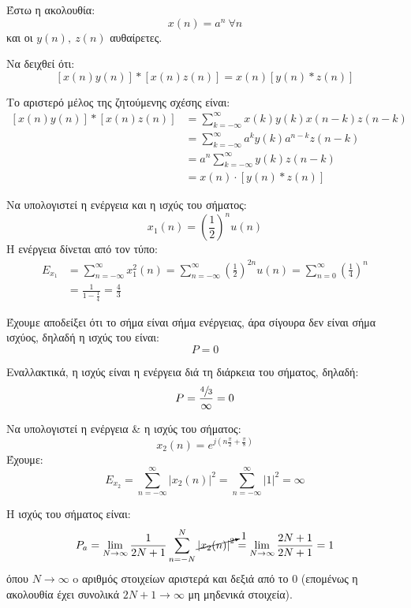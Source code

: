\documentclass[11pt,a4paper,notitlepage,fleqn]{article}
\begin{document}
\begin{exercise}
	Έστω η ακολουθία:
	\[
	x(n) = a^n\ \forall n
	\]
	και οι \( y(n), \ z(n) \) αυθαίρετες.
	
	Να δειχθεί ότι:
	\[
	\left[
	x(n)y(n)
	\right]*\left[
	x(n)z(n)
	\right] = x(n)\left[
	y(n)*z(n)
	\right]
	\]
	
	\tcblower
	
	Το αριστερό μέλος της ζητούμενης σχέσης είναι:
	\begin{align*}
		\left[
		x(n)y(n)
		\right]*\left[
		x(n)z(n)
		\right] &=
		\sum_{k=-\infty}^{\infty}
		x(k)y(k)x(n-k)z(n-k)
		\\ &= \sum_{k=-\infty}^{\infty} a^k y(k)a^{n-k} z(n-k)
		\\ &= a^n \sum_{k=-\infty}^{\infty} y(k) z(n-k)
		\\ &= x(n) \cdot \left[y(n) * z(n)\right]
	\end{align*}
\end{exercise}

\begin{exercise}
	Να υπολογιστεί η ενέργεια και η ισχύς του σήματος:
	\[
	x_1(n) = \left( \frac{1}{2} \right)^n u(n)
	\]
	\tcblower
	Η ενέργεια δίνεται από τον τύπο:
	\begin{align*}
		E_{x_1} &=
		\sum_{n=-\infty}^{\infty}x_1^2(n) = \sum_{n=-\infty}^{\infty}\left(\frac{1}{2}\right)^{2n}
		u(n) = \sum_{n=0}^{\infty}\left( \frac{1}{4} \right)^n
		\\ &= \frac{1}{1-\frac{1}{4}} = \frac{4}{3}
	\end{align*}
	
	Έχουμε αποδείξει ότι το σήμα είναι σήμα ενέργειας, άρα σίγουρα δεν είναι σήμα ισχύος, δηλαδή η ισχύς του είναι:
	\[
	P=0
	\]
	
	Εναλλακτικά, η ισχύς είναι η ενέργεια διά τη διάρκεια του σήματος, δηλαδή:
	\[
	P = \frac{\sfrac{4}{3} }{\infty} = 0
	\]
\end{exercise}

\begin{exercise}
	Να υπολογιστεί η ενέργεια \& η ισχύς του σήματος:
	\[
	x_2(n) = e^{j\left( n\frac{π}{2} + \frac{π}{8} \right)}
	\]
	\tcblower
	Έχουμε:
	\[
	E_{x_2} = \sum_{n=-\infty}^{\infty} \left|x_2(n)\right|^2 = \sum_{n=-\infty}^{\infty} |1|^2 = \infty
	\]
	
	Η ισχύς του σήματος είναι:
	\[
	P_a = \lim_{N\to \infty}\frac{1}{2N+1}
	\sum_{n=-N}^{N} \cancelto{1}{\left|x_2(n)\right|^2}
	= \lim_{N\to \infty}\frac{2N+1}{2N+1} = 1
	\]
	όπου \( N\to \infty \) o αριθμός στοιχείων αριστερά και δεξιά από το 0 (επομένως η ακολουθία έχει συνολικά \( 2N+1\to \infty \) μη μηδενικά στοιχεία).
\end{exercise}
\end{document}
